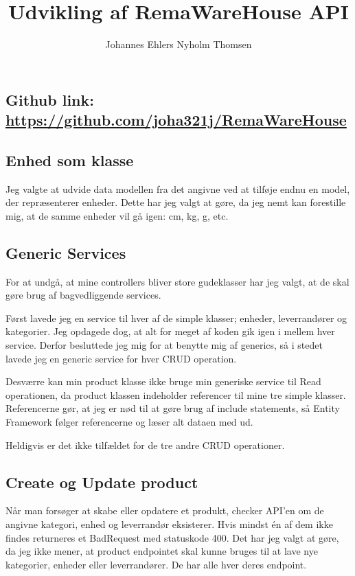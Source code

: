 \documentclass[a4paper]{article}
\author{Johannes Ehlers Nyholm Thomsen}
\begin{document}
\title{Udvikling af RemaWareHouse API}

\maketitle

\subsection*{Github link: \url{https://github.com/joha321j/RemaWareHouse}}

\subsection*{Enhed som klasse}
Jeg valgte at udvide data modellen fra det angivne ved at tilføje endnu en model,
der repræsenterer enheder.
Dette har jeg valgt at gøre, da jeg nemt kan forestille mig,
at de samme enheder vil gå igen: cm, kg, g, etc.

\subsection*{Generic Services}
For at undgå, at mine controllers bliver store gudeklasser har jeg valgt,
at de skal gøre brug af bagvedliggende services.

Først lavede jeg en service til hver af de simple klasser; 
enheder, leverrandører og kategorier.
Jeg opdagede dog, at alt for meget af koden gik igen i mellem hver service.
Derfor besluttede jeg mig for at benytte mig af generics,
så i stedet lavede jeg en generic service for hver CRUD operation.

Desværre kan min product klasse ikke bruge min generiske service til Read operationen,
da product klassen indeholder referencer til mine tre simple klasser.
Referencerne gør, at jeg er nød til at gøre brug af include statements,
så Entity Framework følger referencerne og læser alt dataen med ud.

Heldigvis er det ikke tilfældet for de tre andre CRUD operationer.

\subsection*{Create og Update product}
Når man forsøger at skabe eller opdatere et produkt,
checker API'en om de angivne kategori, enhed og leverrandør eksisterer.
Hvis mindst én af dem ikke findes returneres et BadRequest med statuskode 400.
Det har jeg valgt at gøre, da jeg ikke mener, 
at product endpointet skal kunne bruges til at lave nye kategorier, enheder
eller leverrandører.
De har alle hver deres endpoint. 
\end{document}
